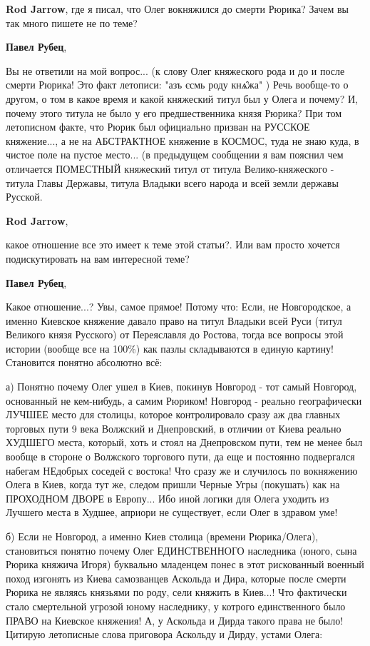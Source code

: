 \begin{itemize}
\begin{itemize}
\textbf{Rod Jarrow}, где я писал, что Олег вокняжился до смерти Рюрика? Зачем вы так много пишете не по теме?

\textbf{Павел Рубец}, 

Вы не ответили на мой вопрос... (к слову Олег княжеского рода и до и после
смерти Рюрика! Это факт летописи: "азъ єсмь роду кнѧ̑жа" ) Речь вообще-то о
другом, о том в какое время и какой княжеский титул был у Олега и почему? И,
почему этого титула не было у его предшественника князя Рюрика? При том
летописном факте, что Рюрик был официально призван на РУССКОЕ княжение..., а не
на АБСТРАКТНОЕ княжение в КОСМОС, туда не знаю куда, в чистое поле на пустое
место... (в предыдущем сообщении я вам пояснил чем отличается ПОМЕСТНЫЙ
княжеский титул от титула Велико-княжеского - титула Главы Державы, титула
Владыки всего народа и всей земли державы Русской.

\textbf{Rod Jarrow}, 

какое отношение все это имеет к теме этой статьи?. Или вам просто хочется
подискутировать на вам интересной теме?

\textbf{Павел Рубец}, 

Какое отношение...? Увы, самое прямое! Потому что: Если, не Новгородское, а
именно Киевское княжение давало право на титул Владыки всей Руси (титул
Великого князя Русского) от Переяславля до Ростова, тогда все вопросы этой
истории (вообще все на 100\%) как пазлы складываются в единую картину!
Становится понятно абсолютно всё:

а) Понятно почему Олег ушел в Киев, покинув Новгород - тот самый Новгород,
основанный не кем-нибудь, а самим Рюриком! Новгород - реально географически
ЛУЧШЕЕ место для столицы, которое контролировало сразу аж два главных торговых
пути 9 века Волжский и Днепровский, в отличии от Киева реально ХУДШЕГО места,
который, хоть и стоял на Днепровском пути, тем не менее был вообще в стороне о
Волжского торгового пути, да еще и постоянно подвергался набегам НЕдобрых
соседей с востока! Что сразу же и случилось по вокняжению Олега в Киев, когда
тут же, следом пришли Черные Угры (покушать) как на ПРОХОДНОМ ДВОРЕ в Европу...
Ибо иной логики для Олега уходить из Лучшего места в Худшее, априори не
существует, если Олег в здравом уме!

б) Если не Новгород, а именно Киев столица (времени Рюрика/Олега), становиться
понятно почему Олег ЕДИНСТВЕННОГО наследника (юного, сына Рюрика княжича Игоря)
буквально младенцем понес в этот рискованный военный поход изгонять из Киева
самозванцев Аскольда и Дира, которые после смерти Рюрика не являясь князьями по
роду, сели княжить в Киев...! Что фактически стало смертельной угрозой юному
наследнику, у котрого единственного было ПРАВО на Киевское княжения! А, у
Аскольда и Дирда такого права не было! Цитирую летописные слова приговора
Аскольду и Дирду, устами Олега:


\end{itemize}
\end{itemize}

